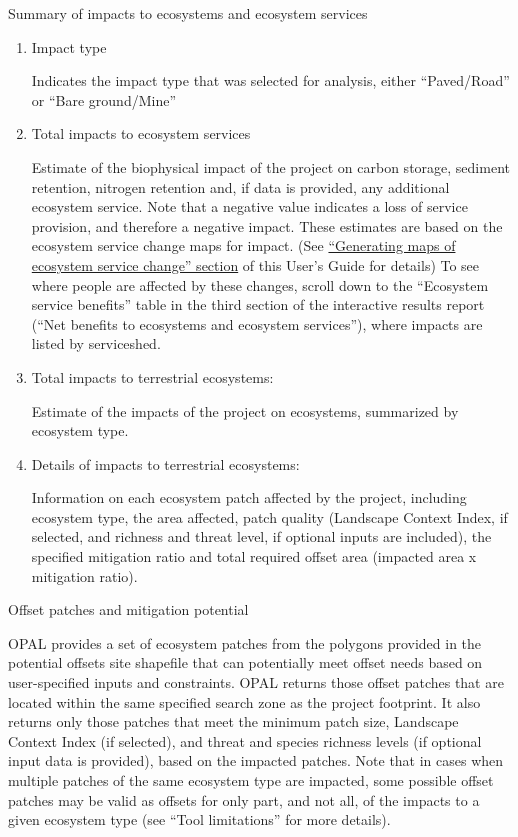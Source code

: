 \documentclass[11pt,letterpaper]{report}
\newenvironment{myenumerate}{%
	\edef\backupindent{\the\parindent}
	\enumerate
	\setlength{\parindent}{\backupindent}
		\setlist[enumerate,1]{label=(\arabic*)}
		\setlist[enumerate,2]{label=(\arabic*)}
}{\endenumerate}
\begin{document}
	\begin{myenumerate}		
	
		{\bfseries \item Summary of impacts to ecosystems and ecosystem services}
		
		\begin{enumerate}[label=\alph*.]
			\item Impact type
				
				Indicates the impact type that was selected for analysis, either ``Paved/Road'' or ``Bare ground/Mine''
				
			\item Total impacts to ecosystem services
			
				Estimate of the biophysical impact of the project on carbon storage, sediment retention, nitrogen retention and, if data is provided, any additional ecosystem service. Note that a negative value indicates a loss of service provision, and therefore a negative impact. These estimates are based on the ecosystem service change maps for impact. (See \hyperref[ch:maps]{``Generating maps of ecosystem service change'' section} of this User's Guide for details) To see where people are affected by these changes, scroll down to the ``Ecosystem service benefits'' table in the third section of the interactive results report (``Net benefits to ecosystems and ecosystem services''), where impacts are listed by serviceshed.
				
			\item Total impacts to terrestrial ecosystems: 
				
				Estimate of the impacts of the project on ecosystems, summarized by ecosystem type.
				
			\item Details of impacts to terrestrial ecosystems: 
			
				Information on each ecosystem patch affected by the project, including ecosystem type, the area affected, patch quality (Landscape Context Index, if selected, and richness and threat level, if optional inputs are included), the specified mitigation ratio and total required offset area (impacted area x mitigation ratio).
				
		\end{enumerate}
		
		
		{\bfseries \item  Offset patches and mitigation potential}
			
			OPAL provides a set of ecosystem patches from the polygons provided in the potential offsets site shapefile that can potentially meet offset needs based on user-specified inputs and constraints. OPAL returns those offset patches that are located within the same specified search zone as the project footprint. It also returns only those patches that meet the minimum patch size, Landscape Context Index (if selected), and threat and species richness levels (if optional input data is provided), based on the impacted patches. Note that in cases when multiple patches of the same ecosystem type are impacted, some possible offset patches may be valid as offsets for only part, and not all, of the impacts to a given ecosystem type (see ``Tool limitations'' for more details). 
			

\end{myenumerate}
\end{document}

